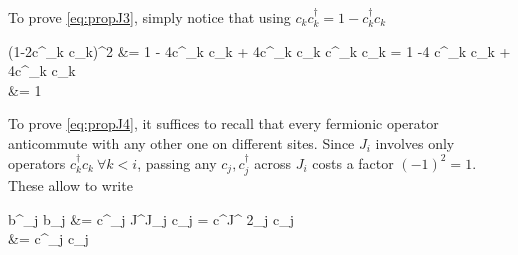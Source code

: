 		To prove \eqref{eq:propJ3}, simply notice that using $c_k c^\dagger_k = 1-c^\dagger_k c_k$
		\be \begin{split} (1-2c^\dagger_k c_k)^2 &= 1 - 4c^\dagger_k c_k + 4c^\dagger_k c_k c^\dagger_k c_k = 1 -4 c^\dagger_k c_k + 4c^\dagger_k c_k \\ &= 1 \end{split} \ee
		To prove \eqref{eq:propJ4}, it suffices to recall that every fermionic operator anticommute with any other one on different sites. Since $J_i$ involves only operators $c^\dagger_k c_k \ \forall k<i$, passing any $c_j, c^\dagger_j$ across $J_i$ costs a factor $(-1)^2=1$.
		These allow to write
		\be \begin{split} b^\dagger_j b_j &= c^\dagger_j J^\dagger J_j c_j = c^\dagger J^
		2_j c_j \\ &= c^\dagger_j c_j \end{split} \label{eq:bbcc} \ee


